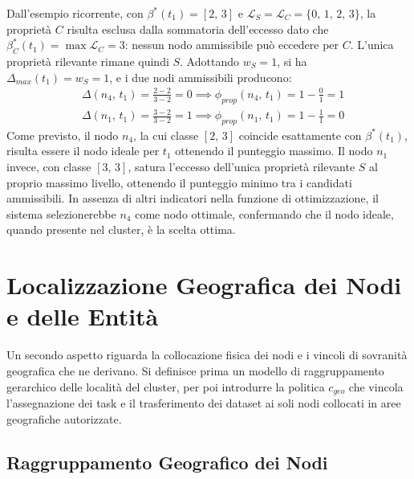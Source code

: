 Dall'esempio ricorrente, con $\beta^*(t_1) = [2,\, 3]$ e $\mathcal{L}_S = \mathcal{L}_C = \{0,\, 1,\, 2,\, 3\}$, la proprietà $C$ risulta esclusa dalla sommatoria dell'eccesso dato che $\beta^*_C(t_1) = \max \mathcal{L}_C = 3$: nessun nodo ammissibile può eccedere per $C$. L'unica proprietà rilevante rimane quindi $S$. Adottando $w_S = 1$, si ha $\Delta_{max}(t_1) = w_S = 1$, e i due nodi ammissibili producono:
\begin{align}
    &\Delta(n_4,\, t_1) = \frac{2 - 2}{3 - 2} = 0
    \implies \phi_{prop}(n_4,\, t_1) = 1 - \frac{0}{1} = 1 \\
    &\Delta(n_1,\, t_1) = \frac{3 - 2}{3 - 2} = 1
    \implies \phi_{prop}(n_1,\, t_1) = 1 - \frac{1}{1} = 0
\end{align}
Come previsto, il nodo $n_4$, la cui classe $[2,\, 3]$ coincide esattamente con $\beta^*(t_1)$, risulta essere il nodo ideale per $t_1$ ottenendo il punteggio massimo. Il nodo $n_1$ invece, con classe $[3,\, 3]$, satura l'eccesso dell'unica proprietà rilevante $S$ al proprio massimo livello, ottenendo il punteggio minimo tra i candidati ammissibili. In assenza di altri indicatori nella funzione di ottimizzazione, il sistema selezionerebbe $n_4$ come nodo ottimale, confermando che il nodo ideale, quando presente nel cluster, è la scelta ottima.


\section{Localizzazione Geografica dei Nodi e delle Entità}
\label{sec:localizzazione_geografica}

Un secondo aspetto riguarda la collocazione fisica dei nodi e i vincoli di sovranità geografica che ne derivano. Si definisce prima un modello di raggruppamento gerarchico delle località del cluster, per poi introdurre la politica $c_{geo}$ che vincola l'assegnazione dei task e il trasferimento dei dataset ai soli nodi collocati in aree geografiche autorizzate.


\subsection{Raggruppamento Geografico dei Nodi}
\label{subsec:raggruppamento_geografico}

